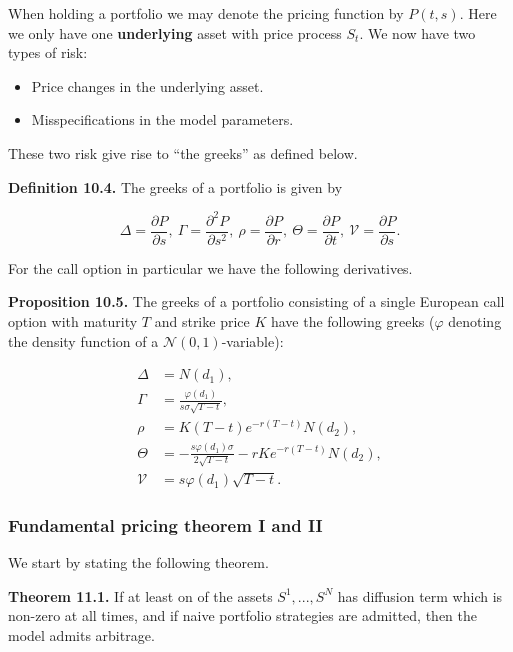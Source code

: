 \documentclass[
]{article}
\providecommand{\tightlist}{%
  \setlength{\itemsep}{0pt}\setlength{\parskip}{0pt}}
\begin{document}
When holding a portfolio we may denote the pricing function by
\(P(t,s)\). Here we only have one \textbf{underlying} asset with price
process \(S_t\). We now have two types of risk:

\begin{itemize}
\tightlist
\item
  Price changes in the underlying asset.
\item
  Misspecifications in the model parameters.
\end{itemize}

These two risk give rise to ``the greeks'' as defined below.

\textbf{Definition 10.4.} The greeks of a portfolio is given by

\[
\Delta=\frac{\partial P}{\partial s},\ \Gamma=\frac{\partial^2 P}{\partial s^2},\ \rho=\frac{\partial P}{\partial r},\ \Theta=\frac{\partial P}{\partial t},\ \mathcal{V}=\frac{\partial P}{\partial s}.
\]

For the call option in particular we have the following derivatives.

\textbf{Proposition 10.5.} The greeks of a portfolio consisting of a
single European call option with maturity \(T\) and strike price \(K\)
have the following greeks (\(\varphi\) denoting the density function of
a \(\mathcal{N}(0,1)\)-variable):

\begin{align*}
\Delta&=N(d_1),\\
\Gamma&=\frac{\varphi(d_1)}{s\sigma\sqrt{T-t}},\\
\rho&=K(T-t)e^{-r(T-t)}N(d_2),\\
\Theta&=-\frac{s\varphi(d_1)\sigma}{2\sqrt{T-t}}-rKe^{-r(T-t)}N(d_2),\\
\mathcal{V}&=s\varphi(d_1)\sqrt{T-t}.
\end{align*}

\hypertarget{fundamental-pricing-theorem-i-and-ii}{%
\subsubsection{Fundamental pricing theorem I and
II}\label{fundamental-pricing-theorem-i-and-ii}}

We start by stating the following theorem.

\textbf{Theorem 11.1.} If at least on of the assets \(S^1,...,S^N\) has
diffusion term which is non-zero at all times, and if naive portfolio
strategies are admitted, then the model admits arbitrage.
\end{document}
